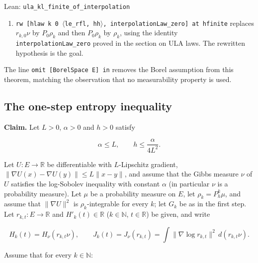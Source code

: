 \documentclass[11pt,a4paper]{report}
\begin{document}
\begin{leanbox}{Lean: \texttt{ula\_\allowbreak{}kl\_\allowbreak{}finite\_\allowbreak{}of\_\allowbreak{}interpolation}}
\begin{enumerate}
\item \texttt{rw [hlaw k 0 \ensuremath{\langle}le\_\allowbreak{}rfl, hh\ensuremath{\rangle}, interpolation\allowbreak{}Law\_\allowbreak{}zero] at hfinite} replaces \(r_{k,0}\nu\) by \(P_0\rho_k\) and then \(P_0\rho_k\) by \(\rho_k\), using the identity \texttt{interpolation\allowbreak{}Law\_\allowbreak{}zero} proved in the section on ULA laws. The rewritten hypothesis is the goal.

\end{enumerate}



The line \texttt{omit [Borel\allowbreak{}Space E] in} removes the Borel assumption from this theorem, matching the observation that no measurability property is used.
\end{leanbox}
\subsection{\texorpdfstring{The one-step entropy inequality}{The one-step entropy inequality}}
\label{report-step-UnadjustedLangevin-LSI-Theorem-lean-3}


\textbf{Claim.} Let \(L>0\), \(\alpha>0\) and \(h>0\) satisfy


\[\alpha\le L,\qquad h\le\frac{\alpha}{4L^2}.\]


Let \(U:E\to\mathbb R\) be differentiable with \(L\)-Lipschitz gradient, \(\|\nabla U(x)-\nabla U(y)\|\le L\|x-y\|\), and assume that the Gibbs measure \(\nu\) of \(U\) satisfies the log-Sobolev inequality with constant \(\alpha\) (in particular \(\nu\) is a probability measure). Let \(\mu\) be a probability measure on \(E\), let \(\rho_k=P_h^k\mu\), and assume that \(\|\nabla U\|^2\) is \(\rho_k\)-integrable for every \(k\); let \(G_k\) be as in the first step. Let \(r_{k,t}:E\to\mathbb R\) and \(H'_k(t)\in\mathbb R\) (\(k\in\mathbb N\), \(t\in\mathbb R\)) be given, and write


\[H_k(t)=H_\nu(r_{k,t}\nu),\qquad J_k(t)=J_\nu(r_{k,t})=\int\|\nabla\log r_{k,t}\|^2\,d(r_{k,t}\nu).\]


Assume that for every \(k\in\mathbb N\):
\end{document}
